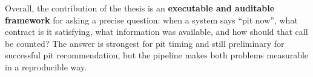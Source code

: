 Overall, the contribution of the thesis is an \textbf{executable and auditable framework} for asking a precise question: when a system says ``pit now'', 
what contract is it satisfying, what information was available, and how should that call be counted? The answer is strongest for pit timing and still 
preliminary for successful pit recommendation, but the pipeline makes both problems measurable in a reproducible way.
